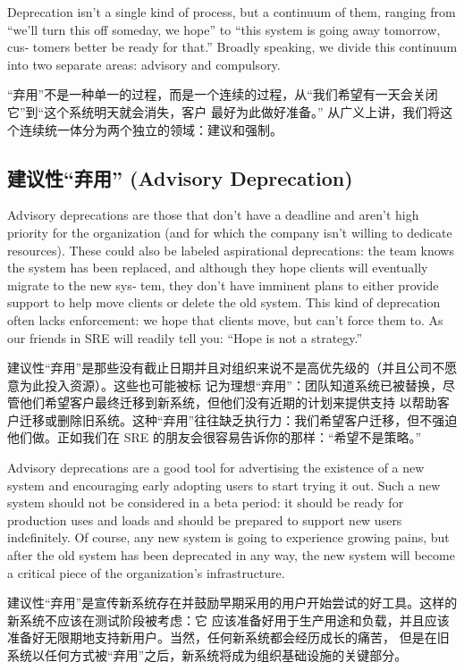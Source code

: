 \documentclass[10pt,a4paper,UTF8]{ctexart}
\begin{document}
Deprecation isn’t a single kind of process, but a continuum of them, ranging from “we’ll turn this
off someday, we hope” to “this system is going away tomorrow, cus‐ tomers better be ready for that.”
Broadly speaking, we divide this continuum into two separate areas: advisory and compulsory.

“弃用”不是一种单一的过程，而是一个连续的过程，从“我们希望有一天会关闭它”到“这个系统明天就会消失，客户
最好为此做好准备。” 从广义上讲，我们将这个连续统一体分为两个独立的领域：建议和强制。
\subsection{建议性“弃用” (Advisory Deprecation)}
\label{sec:org6468a10}

Advisory deprecations are those that don’t have a deadline and aren’t high priority for the
organization (and for which the company isn’t willing to dedicate resources). These could also be
labeled aspirational deprecations: the team knows the system has been replaced, and although they
hope clients will eventually migrate to the new sys‐ tem, they don’t have imminent plans to either
provide support to help move clients or delete the old system. This kind of deprecation often lacks
enforcement: we hope that clients move, but can’t force them to. As our friends in SRE will readily
tell you: “Hope is not a strategy.”

建议性“弃用”是那些没有截止日期并且对组织来说不是高优先级的（并且公司不愿意为此投入资源）。这些也可能被标
记为理想“弃用”：团队知道系统已被替换，尽管他们希望客户最终迁移到新系统，但他们没有近期的计划来提供支持
以帮助客户迁移或删除旧系统。这种“弃用”往往缺乏执行力：我们希望客户迁移，但不强迫他们做。正如我们在 SRE
的朋友会很容易告诉你的那样：“希望不是策略。”

Advisory deprecations are a good tool for advertising the existence of a new system and encouraging
early adopting users to start trying it out. Such a new system should not be considered in a beta
period: it should be ready for production uses and loads and should be prepared to support new users
indefinitely. Of course, any new system is going to experience growing pains, but after the old
system has been deprecated in any way, the new system will become a critical piece of the
organization’s infrastructure.

建议性“弃用”是宣传新系统存在并鼓励早期采用的用户开始尝试的好工具。这样的新系统不应该在测试阶段被考虑：它
应该准备好用于生产用途和负载，并且应该准备好无限期地支持新用户。当然，任何新系统都会经历成长的痛苦，
但是在旧系统以任何方式被“弃用”之后，新系统将成为组织基础设施的关键部分。
\end{document}
